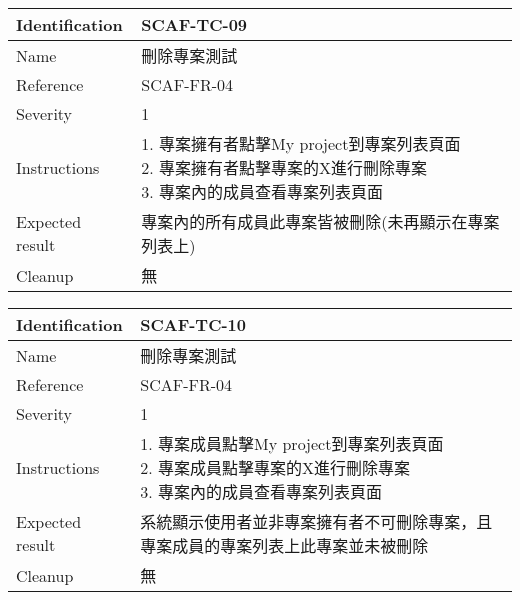 \documentclass{report}
\begin{document}
\begin{tabularx}{0.9\textwidth}{
  |p{}%
  |p{}|%
  }
  \hline
  \centering Identification &  SCAF-TC-09 \\
  \hline
  \centering Name & 刪除專案測試 \\
  \hline
  \centering Reference & SCAF-FR-04 \\
  \hline
  \centering Severity & 1 \\
  \hline
  \centering Instructions & 
  \makecell{
    1. 專案擁有者點擊My project到專案列表頁面 \\
    2. 專案擁有者點擊專案的X進行刪除專案 \\
    3. 專案內的成員查看專案列表頁面 
  }\\
  \hline
  \centering Expected result & 專案內的所有成員此專案皆被刪除(未再顯示在專案列表上) \\
  \hline
  \centering Cleanup & 無 \\
  \hline
\end{tabularx}
\newline\newline


\begin{tabularx}{0.9\textwidth}{
  |p{}%
  |p{}|%
  }
  \hline
  \centering Identification &  SCAF-TC-10 \\
  \hline
  \centering Name & 刪除專案測試 \\
  \hline
  \centering Reference & SCAF-FR-04 \\
  \hline
  \centering Severity & 1 \\
  \hline
  \centering Instructions & 
  \makecell{
    1. 專案成員點擊My project到專案列表頁面 \\
    2. 專案成員點擊專案的X進行刪除專案 \\
    3. 專案內的成員查看專案列表頁面  
  }\\
  \hline
  \centering Expected result & 系統顯示使用者並非專案擁有者不可刪除專案，且專案成員的專案列表上此專案並未被刪除 \\
  \hline
  \centering Cleanup & 無 \\
  \hline
\end{tabularx}
\newline\newline
\end{document}
